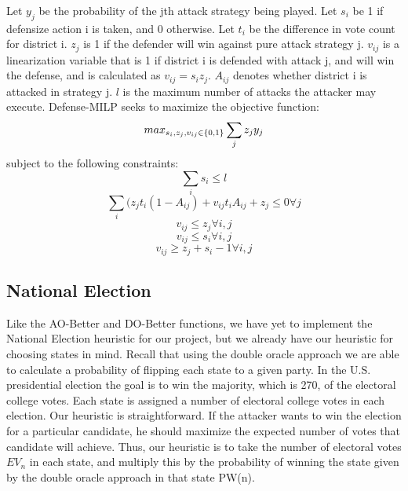 \documentclass[letterpaper]{article} %
\begin{document}
Let $y_j$ be the probability of the jth attack strategy being played. Let $s_i$ be 1 if defensize action i is taken, and 0 otherwise. Let $t_i$ be the difference in vote count for district i. $z_j$ is 1 if the defender will win against pure attack strategy j. $v_{ij}$ is a linearization variable that is 1 if district i is defended with attack j, and will win the defense, and is calculated as $v_{ij} = s_iz_j$. $A_{ij}$ denotes whether district i is attacked in strategy j. $l$ is the maximum number of attacks the attacker may execute. 
Defense-MILP seeks to maximize the objective function:
\begin{equation}
max_{s_i,z_j,v_{ij} \in \{0,1\}}\sum_{j}z_{j}y_j \\
\end{equation}
subject to the following constraints:
\begin{equation}
\sum_{i}s_{i} \leq l
\end{equation}
\begin{equation}
\sum_{i}(z_jt_i(1-A_{ij}) + v_{ij}t_iA_{ij} + z_j \leq 0 \forall j
\end{equation}
\begin{equation}
v_{ij} \leq z_j \forall i,j
\end{equation}
\begin{equation}
v_{ij} \leq s_i \forall i,j
\end{equation}
\begin{equation}
v_{ij} \geq z_j+s_i-1 \forall i,j
\end{equation}


\subsection{National Election}
Like the AO-Better and DO-Better functions, we have yet to implement the National Election heuristic for our project, but we already have our heuristic for choosing states in mind. Recall that using the double oracle approach we are able to calculate a probability of flipping each state to a given party. In the U.S. presidential election the goal is to win the majority, which is 270, of the electoral college votes. Each state is assigned a number of electoral college votes in each election. Our heuristic is straightforward. If the attacker wants to win the election for a particular candidate, he should maximize the expected number of votes that candidate will achieve. Thus, our heuristic is to take the number of electoral votes $EV_n$ in each state, and multiply this by the probability of winning the state given by the double oracle approach in that state PW(n). 
\end{document}
